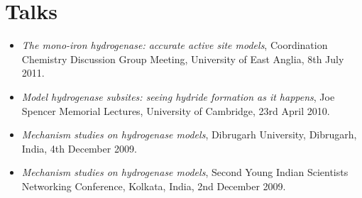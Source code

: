 \documentclass[11pt,draft]{article}
\newcommand*\paper[2]{%
  \item \href{http://dx.doi.org/#1}{\ignorespaces#2\unskip.}
}
\newcommand*\papertitle[1]{%
  \begingroup
    \addfontfeature{Numbers = Lining}%
    \emph{#1}%
  \endgroup
}
\begin{document}
\begin{comment}

\section{Publications}

A total of 44 publications in per-reviewed journals. Recent papers
include
\begin{itemize}
  \paper{10.1039/c1cc11320h}{
    \papertitle{The role of CN and CO ligands in the vibrational relaxation
    dynamics of model compounds of the [FeFe]-\break hydrogenase enzyme},
    S.~Kaziannis, J.~A. Wright, M.~Candelaresi, R.~Kania, G.~M. Greetham,
    A.~W. Parker, C.~J. Pickett and N.~T. Hunt 
    \emph{Phys. Chem. Chem. Phys.}, 2011, \textbf{13}, 10295--10305
  }
  
  \paper{10.1039/c1cc11320h}{
    \papertitle{The hafnium-mediated NH activation of an amido-borane},
    E.~A. Jacobs, A.-M. Fuller, S.~J. Lancaster and J.~A. Wright,
    \emph{Chem. Commun.}, 2011, \textbf{47}, 5870--5872
  }
  
  \paper{10.1002/ejic.201001072}{
    \papertitle{[FeFe]-Hydrogenase models: unexpected variation in
    protonation rate between dithiolate bridge analogues},
    A.~Jablonskytė, J.~A. Wright and C.~J. Pickett, \emph{Eur.~J.
    Inorg. Chem.}, 2011, 1033--1037
  }

  \paper{10.1002/anie.201004189}{
    \papertitle{The Third Hydrogenase: A Ferracyclic Carbamoyl with Close
    Structural Analogy to the Active Site of Hmd}, P.~J. Turrell,
    J.~A. Wright, J.~N.~T. Peck, V.~Oganesyan and C.~J. Pickett,
    \emph{Angew. Chem. Int. Ed.}, 2010, \textbf{49}, 7508--7511
  }
\end{itemize}

\end{comment}

\section{Talks}

\begin{itemize}
  \item \emph{The mono-iron hydrogenase: accurate active site models},
    Coordination Chemistry Discussion Group Meeting, University of
    East Anglia, 8th July 2011.
  \item \emph{Model hydrogenase subsites: seeing hydride formation as
    it happens}, Joe Spencer Memorial Lectures, University of
    Cambridge, 23rd April 2010.
  \item \emph{Mechanism studies on hydrogenase models},
    Dibrugarh University, Dibrugarh, India, 4th December 2009.
  \item \emph{Mechanism studies on hydrogenase models},
    Second Young Indian Scientists Networking Conference,
    Kolkata, India, 2nd December 2009.
\end{itemize}
\end{document}
